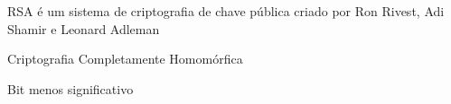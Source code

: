 \item [RSA] RSA é um sistema de criptografia de chave pública criado por Ron Rivest, Adi Shamir e Leonard Adleman
\item [CCH] Criptografia Completamente Homomórfica
\item [BMS] Bit menos significativo

